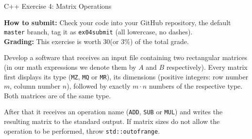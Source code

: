 \documentclass[11pt]{article}
\begin{document}
\thispagestyle{empty}


\begin{center}
{\Large C++ Exercise 4: Matrix Operations}
\end{center}

\begin{abstract}
This exercise covers polymorphism, function overloading as well as operator
overloading, raising domain-specific exceptions or error conditions.
\end{abstract}


{\bf How to submit:} Check your code into your GitHub repository, the default {\tt master} branch, 
tag it as {\tt ex04submit} (all lowercase, no dashes).\\
{\bf Grading:} This exercise is worth 30\textperthousand (or $3\%$) of the total grade.


\vspace{10pt}
Develop a software that receives an input file containing
two rectangular matrices (in our math expressions we denote them by $A$ and $B$ respectively). 
Every matrix first displays its type ({\tt MZ}, {\tt MQ} or {\tt MR}), 
its dimensions (positive integers: row number $m$, column number $n$), followed by exactly $m \cdot n$ numbers
of the respective type. Both matrices are of the same type.

After that it receives an operation name ({\tt ADD}, {\tt SUB} or {\tt MUL}) and 
writes the resulting matrix to the standard output.
If matrix sizes do not allow the operation to be performed, 
throw {\tt std::out\textunderscore{}of\textunderscore{}range}. 
\end{document}
